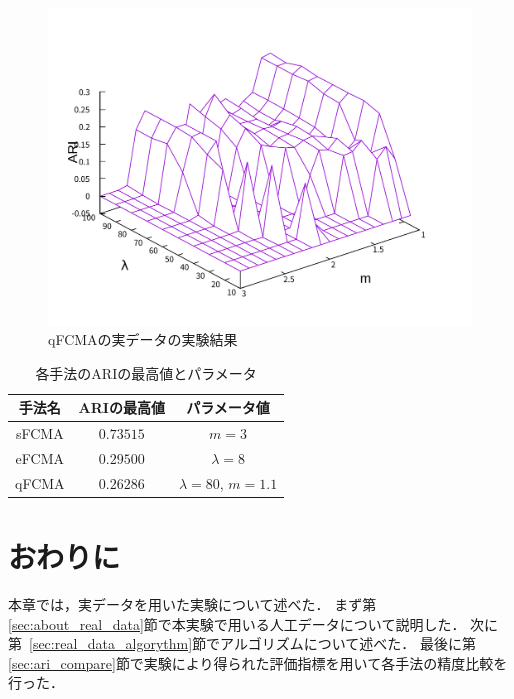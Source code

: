 \documentclass[a4j,12pt,dvipdfmx,oneside]{jsbook}
\theoremstyle{definition}
\begin{document}
\begin{figure}[p]
\begin{minipage}{0.43\hsize}
    \includegraphics[width=\linewidth]{qFCMA_ARI.pdf}
    \caption{qFCMAの実データの実験結果}
    \label{fig:qFCMA_ARI}
   \end{minipage}
  \end{figure}

  \begin{table}[p]
   \centering
   \caption{各手法のARIの最高値とパラメータ}
   \begin{center}
    \begin{tabular}{ c || c | c }\hline
     手法名 & ARIの最高値 & パラメータ値\\ \hline \hline
     sFCMA & $0.73515$ & $m = 3$\\ \hline
     eFCMA & $0.29500$& $\lambda = 8$\\ \hline  
     qFCMA & $0.26286$ & $\lambda = 80$, $m = 1.1$\\  \hline
    \end{tabular}
    \label{tbl:max_ari}
   \end{center}
  \end{table}


  \section{おわりに}\label{sec:real_data_summary}
  本章では，実データを用いた実験について述べた．
  まず第\ref{sec:about_real_data}節で本実験で用いる人工データについて説明した．
  次に第~\ref{sec:real_data_algorythm}節でアルゴリズムについて述べた．
  最後に第\ref{sec:ari_compare}節で実験により得られた評価指標を用いて各手法の精度比較を行った．
  
\end{document}
